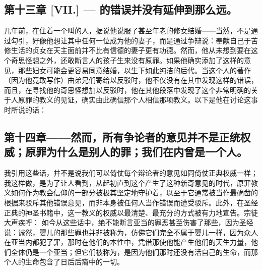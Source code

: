 
\subsection{第十三章 [VII.] — 的错误并没有延伸到那么远。}

几年前，在住着一个叫的人，据说他说服了甚至年老的修女结婚——当然，不是通过勾引，好像他想让其中任何一位成为他的妻子，而是通过争辩说：奉献自己于苦修生活的贞女在天主面前并不比有信德的妻子更有功德。然而，他从未想到要在这个奇思怪想之外，还敢断言人的孩子生来没有原罪。如果他确实添加了这样的意见，那些妇女可能会更容易同意结婚，以生下如此纯洁的后代。当这个人的著作（因为他竟敢写作）由弟兄们寄给以反驳时，他不仅没有在其中发现这样的错误，而且，在寻找他的奇思怪想加以反驳时，他在其他段落中发现了这个非常明确的关于人原罪的教义的见证，确实由此确信那个人相信那项教义。以下是他在讨论这事时所说的话：\par


\subsection{第十四章——然而，所有争论者的意见并不是正统权威；原罪为什么是别人的罪；我们在内曾是一个人。}

我引用这些话，并不是说我们可以倚仗每个辩论者的意见如同倚仗正典权威一样；我这样做，是为了让人看到，从起初直到这个产生了这种新奇意见的时代，原罪教义如何作为教会信仰的一部分被极其坚定地守护着，以至于它通常被当作最确凿的根据来驳斥其他错误意见，而非本身被任何人当作错误而遭受驳斥。此外，在圣经正典的神圣书籍中，这一教义的权威以最清楚、最充分的方式被有力地宣告。宗徒大声疾呼： 如今从这些话中，绝不能断言亚当的罪恶甚至伤害了那些，因为圣经说：诚然，婴儿的那些罪也并非被称为，仿佛它们完全不属于婴儿一样，因为众人在亚当内都犯了罪，那时在他们的本性中，凭借那使他能产生他们的天生力量，他们全体仍是一个亚当；但它们被称为，是因为他们那时还没有活自己的生命，而那个人的生命包含了日后后裔中的一切。\par

